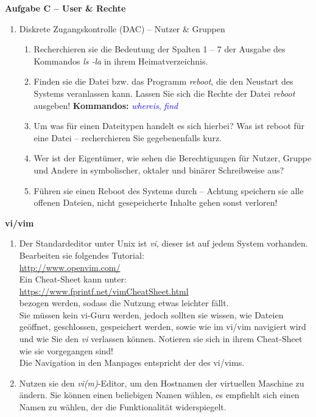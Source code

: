 \documentclass[paper=a4,fontsize=11pt]{scrartcl}%
\numberwithin{equation}{section}
\begin{document}
\begin{center}\Large{\textbf{Aufgabe C -- User \& Rechte}}\end{center}\vskip0.25in
\begin{enumerate}
\item Diskrete Zugangskontrolle (DAC) -- Nutzer \& Gruppen
	\begin{enumerate}[label=(\alph*)]
        \item Recherchieren sie die Bedeutung der Spalten 1 -- 7 der Ausgabe des Kommandos \emph{ls -la} in ihrem Heimatverzeichnis.
        \item Finden sie die Datei bzw. das Programm \textit{reboot}, die den Neustart des Systems veranlassen kann. Lassen Sie sich die Rechte der Datei \textit{reboot} ausgeben!
        \textbf{Kommandos:} \textcolor{blue}{\emph{whereis}, \emph{find}}
        \item Um was für einen Dateitypen handelt es sich hierbei? Was ist reboot für eine Datei -- recherchieren Sie gegebenenfalls kurz.
        \item Wer ist der Eigentümer, wie sehen die Berechtigungen für Nutzer, Gruppe und Andere in symbolischer, oktaler und binärer Schreibweise aus?
        \item Führen sie einen Reboot des Systems durch -- Achtung speichern sie alle offenen Dateien, nicht gesepeicherte Inhalte gehen sonst verloren!
  \end{enumerate}
\end{enumerate}
\begin{center}\Large{\textbf{vi/vim}}\end{center}\vskip0.25in
\begin{enumerate}
	\item Der Standardeditor unter Unix ist \emph{vi}, dieser ist auf jedem System vorhanden. Bearbeiten sie folgendes Tutorial:\\
	\url{http://www.openvim.com/}\\
	Ein Cheat-Sheet kann unter:\\
	\url{https://www.fprintf.net/vimCheatSheet.html}\\
	bezogen werden, sodass die Nutzung etwas leichter fällt.\\
	Sie müssen kein vi-Guru werden, jedoch sollten sie wissen, wie Dateien geöffnet, geschlossen, gespeichert werden, sowie wie im vi/vim navigiert wird und wie Sie den \emph{vi} verlassen können. Notieren sie sich in ihrem Cheat-Sheet wie sie vorgegangen sind!\\
	Die Navigation in den Manpages entspricht der des vi/vims.
	\item Nutzen sie den \emph{vi(m)}-Editor, um den Hostnamen der virtuellen Maschine zu ändern. Sie können einen beliebigen Namen wählen, es empfiehlt sich einen Namen zu wählen, der die Funktionalität widerspiegelt.
\end{enumerate}
\end{document}

